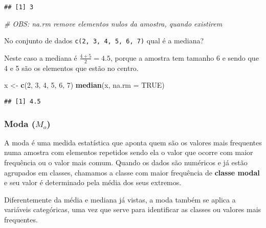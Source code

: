 \documentclass[12pt,]{style/krantz}
\makeatletter
\newenvironment{Shaded}{\begin{snugshade}}{\end{snugshade}}
\newcommand{\KeywordTok}[1]{\textcolor[rgb]{0.13,0.29,0.53}{\textbf{#1}}}
\newcommand{\DataTypeTok}[1]{\textcolor[rgb]{0.13,0.29,0.53}{#1}}
\newcommand{\DecValTok}[1]{\textcolor[rgb]{0.00,0.00,0.81}{#1}}
\newcommand{\StringTok}[1]{\textcolor[rgb]{0.31,0.60,0.02}{#1}}
\newcommand{\CommentTok}[1]{\textcolor[rgb]{0.56,0.35,0.01}{\textit{#1}}}
\newcommand{\OtherTok}[1]{\textcolor[rgb]{0.56,0.35,0.01}{#1}}
\newcommand{\NormalTok}[1]{#1}
\renewenvironment{quote}{\begin{VF}}{\end{VF}}
\newenvironment{kframe}{%
\medskip{}
\setlength{\fboxsep}{.8em}
 \def\at@end@of@kframe{}%
 \ifinner\ifhmode%
  \def\at@end@of@kframe{\end{minipage}}%
  \begin{minipage}{\columnwidth}%
 \fi\fi%
 \def\FrameCommand##1{\hskip\@totalleftmargin \hskip-\fboxsep
 \colorbox{shadecolor}{##1}\hskip-\fboxsep
     \hskip-\linewidth \hskip-\@totalleftmargin \hskip\columnwidth}%
 \MakeFramed {\advance\hsize-\width
   \@totalleftmargin\z@ \linewidth\hsize
   \@setminipage}}%
 {\par\unskip\endMakeFramed%
 \at@end@of@kframe}
\renewenvironment{Shaded}{\begin{kframe}}{\end{kframe}}
\theoremstyle{definition}
\theoremstyle{definition}
\theoremstyle{definition}
\theoremstyle{remark}
\let\BeginKnitrBlock\begin \let\EndKnitrBlock\end
\makeatother
\begin{document}
\begin{verbatim}
## [1] 3
\end{verbatim}

\begin{Shaded}
\begin{Highlighting}[]
\CommentTok{# OBS: na.rm remove elementos nulos da amostra, quando existirem}
\end{Highlighting}
\end{Shaded}

\BeginKnitrBlock{example}
\protect\hypertarget{exm:unnamed-chunk-54}{}{\label{exm:unnamed-chunk-54}
}No conjunto de dados \texttt{c(2,\ 3,\ 4,\ 5,\ 6,\ 7)} qual é a
mediana?
\EndKnitrBlock{example}

Neste caso a mediana é \(\frac{4 + 5}{2} = 4.5\), porque a amostra tem
tamanho 6 e sendo que 4 e 5 são os elementos que estão no centro.

\begin{Shaded}
\begin{Highlighting}[]
\NormalTok{x <-}\StringTok{ }\KeywordTok{c}\NormalTok{(}\DecValTok{2}\NormalTok{, }\DecValTok{3}\NormalTok{, }\DecValTok{4}\NormalTok{, }\DecValTok{5}\NormalTok{, }\DecValTok{6}\NormalTok{, }\DecValTok{7}\NormalTok{)}
\KeywordTok{median}\NormalTok{(x, }\DataTypeTok{na.rm =} \OtherTok{TRUE}\NormalTok{)}
\end{Highlighting}
\end{Shaded}

\begin{verbatim}
## [1] 4.5
\end{verbatim}

\subsubsection{\texorpdfstring{Moda
(\(M_o\))}{Moda (M\_o)}}\label{moda-m_o}

A moda é uma medida estatística que aponta quem são os valores mais
frequentes numa amostra com elementos repetidos sendo ela o valor que
ocorre com maior frequência ou o valor mais comum. Quando os dados são
numéricos e já estão agrupados em classes, chamamos a classe com maior
frequência de \textbf{classe modal} e seu valor é determinado pela média
dos seus extremos.

\begin{quote}
Diferentemente da média e mediana já vistas, a moda também se aplica a
variáveis categóricas, uma vez que serve para identificar as classes ou
valores mais frequentes.
\end{quote}
\end{document}
